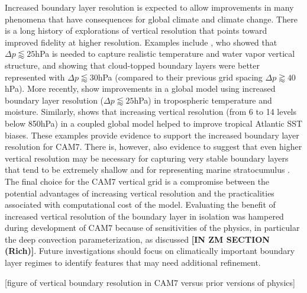 \documentclass[draft]{agujournal2019}
\begin{document}
Increased boundary layer resolution is expected to allow improvements in many phenomena that have consequences for global climate and climate change. There is a long history of explorations of vertical resolution that points toward improved fidelity at higher resolution. Examples include , who showed that $\Delta p \lessapprox 25$hPa is needed to capture realistic temperature and water vapor vertical structure, and  showing that cloud-topped boundary layers were better represented with $\Delta p \lessapprox 30$hPa (compared to their previous grid spacing $\Delta p \gtrapprox 40$hPa). More recently,  show improvements in a global model using increased boundary layer resolution ($\Delta p \lessapprox 25$hPa) in tropospheric temperature and moisture. Similarly,  shows that increasing vertical resolution (from 6 to 14 levels below 850hPa) in a coupled global model helped to improve tropical Atlantic SST biases. These examples provide evidence to support the increased boundary layer resolution for CAM7. There is, however, also evidence to suggest that even higher vertical resolution may be necessary for capturing very stable boundary layers that tend to be extremely shallow \cite{Vignon:2018} and for representing marine stratocumulus \cite{Bogenschutz:2021}. The final choice for the CAM7 vertical grid is a compromise between the potential advantages of increasing vertical resolution and the practicalities associated with computational cost of the model. Evaluating the benefit of increased vertical resolution of the boundary layer in isolation was hampered during development of CAM7 because of sensitivities of the physics, in particular the deep convection parameterization, as discussed \textbf{[IN ZM SECTION (Rich)]}. Future investigations should focus on climatically important boundary layer regimes to identify features that may need additional refinement.

{\color{blue}{ARH - add in Hailey Shin papers showing improvement in TREFHT when lowest model level is closer to the surface. The papers illustrate this improvement is related to errors in the MO algorithm above some threshold altitude.}}

[figure of vertical boundary resolution in CAM7 versus prior versions of physics]
%
\end{document}
